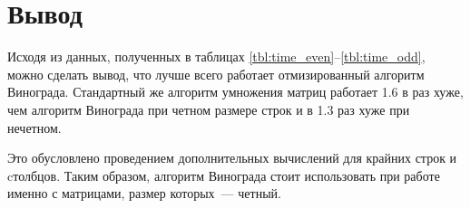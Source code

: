 \section*{Вывод}
Исходя из данных, полученных в таблицах \ref{tbl:time_even}--\ref{tbl:time_odd}, можно сделать вывод, что лучше всего работает отмизированный алгоритм Винограда.
Стандартный же алгоритм умножения матриц работает 1.6 в раз хуже, чем алгоритм Винограда при четном размере строк и в 1.3 раз хуже при нечетном.

Это обусловлено проведением дополнительных вычислений для крайних строк и cтолбцов. Таким образом, алгоритм Винограда стоит использовать при работе именно с матрицами, размер которых~--- четный.